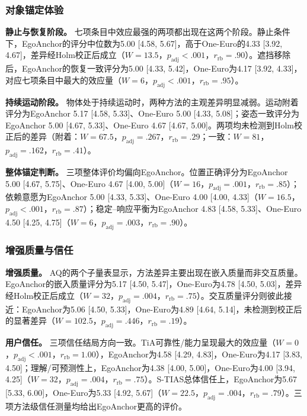 \documentclass[review]{vgtc}
\begin{document}


\subsubsection{对象锚定体验}

\textbf{静止与恢复阶段。}
七项条目中效应最强的两项都出现在这两个阶段。静止条件下，EgoAnchor的评分中位数为5.00 [4.58, 5.67]，高于One-Euro的4.33 [3.92, 4.67]，差异经Holm校正后成立（$W=13.5$，$p_{\mathrm{adj}}<.001$，$r_{\mathrm{rb}}=.90$）。遮挡移除后，EgoAnchor的恢复一致评分为5.00 [4.33, 5.42]，One-Euro为4.17 [3.92, 4.33]，对应七项条目中最大的效应量（$W=6$，$p_{\mathrm{adj}}<.001$，$r_{\mathrm{rb}}=.95$）。

\textbf{持续运动阶段。}
物体处于持续运动时，两种方法的主观差异明显减弱。运动附着评分为EgoAnchor 5.17 [4.58, 5.33]、One-Euro 5.00 [4.33, 5.08]；姿态一致评分为EgoAnchor 5.00 [4.67, 5.33]、One-Euro 4.67 [4.67, 5.00]。两项均未检测到Holm校正后的差异（附着：$W=67.5$，$p_{\mathrm{adj}}=.267$，$r_{\mathrm{rb}}=.29$；一致：$W=81$，$p_{\mathrm{adj}}=.162$，$r_{\mathrm{rb}}=.41$）。

\textbf{整体锚定判断。}
三项整体评价均偏向EgoAnchor。位置正确评分为EgoAnchor 5.00 [4.67, 5.75]、One-Euro 4.67 [4.00, 5.00]（$W=16$，$p_{\mathrm{adj}}=.001$，$r_{\mathrm{rb}}=.85$）；依赖意愿为EgoAnchor 5.00 [4.33, 5.33]、One-Euro 4.00 [4.00, 4.33]（$W=16.5$，$p_{\mathrm{adj}}<.001$，$r_{\mathrm{rb}}=.87$）；稳定--响应平衡为EgoAnchor 4.83 [4.58, 5.33]、One-Euro 4.50 [4.25, 4.75]（$W=6$，$p_{\mathrm{adj}}=.003$，$r_{\mathrm{rb}}=.90$）。

\subsubsection{增强质量与信任}

\textbf{增强质量。}
AQ的两个子量表显示，方法差异主要出现在嵌入质量而非交互质量。EgoAnchor的嵌入质量评分为5.17 [4.50, 5.47]，One-Euro为4.78 [4.50, 5.03]，差异经Holm校正后成立（$W=32$，$p_{\mathrm{adj}}=.004$，$r_{\mathrm{rb}}=.75$）。交互质量评分则彼此接近：EgoAnchor为5.06 [4.50, 5.33]，One-Euro为4.89 [4.64, 5.14]，未检测到校正后的显著差异（$W=102.5$，$p_{\mathrm{adj}}=.446$，$r_{\mathrm{rb}}=.19$）。

\textbf{用户信任。}
三项信任结局方向一致。TiA可靠性/能力呈现最大的效应量（$W=0$，$p_{\mathrm{adj}}<.001$，$r_{\mathrm{rb}}=1.00$），EgoAnchor为4.58 [4.29, 4.83]，One-Euro为4.17 [3.83, 4.50]；理解/可预测性上，EgoAnchor为4.38 [4.00, 5.00]，One-Euro为4.00 [3.94, 4.25]（$W=32$，$p_{\mathrm{adj}}=.004$，$r_{\mathrm{rb}}=.75$）。S-TIAS总体信任上，EgoAnchor为5.67 [5.33, 6.00]，One-Euro为5.33 [4.92, 5.67]（$W=22.5$，$p_{\mathrm{adj}}=.004$，$r_{\mathrm{rb}}=.79$）。三项方法级信任测量均给出EgoAnchor更高的评价。
\end{document}

